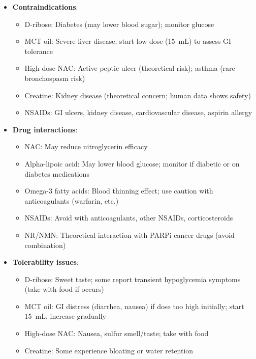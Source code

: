\begin{itemize}
    \item \textbf{Contraindications}:
    \begin{itemize}
        \item D-ribose: Diabetes (may lower blood sugar); monitor glucose
        \item MCT oil: Severe liver disease; start low dose (15~mL) to assess GI tolerance
        \item High-dose NAC: Active peptic ulcer (theoretical risk); asthma (rare bronchospasm risk)
        \item Creatine: Kidney disease (theoretical concern; human data shows safety)
        \item NSAIDs: GI ulcers, kidney disease, cardiovascular disease, aspirin allergy
    \end{itemize}

    \item \textbf{Drug interactions}:
    \begin{itemize}
        \item NAC: May reduce nitroglycerin efficacy
        \item Alpha-lipoic acid: May lower blood glucose; monitor if diabetic or on diabetes medications
        \item Omega-3 fatty acids: Blood thinning effect; use caution with anticoagulants (warfarin, etc.)
        \item NSAIDs: Avoid with anticoagulants, other NSAIDs, corticosteroids
        \item NR/NMN: Theoretical interaction with PARPi cancer drugs (avoid combination)
    \end{itemize}

    \item \textbf{Tolerability issues}:
    \begin{itemize}
        \item D-ribose: Sweet taste; some report transient hypoglycemia symptoms (take with food if occurs)
        \item MCT oil: GI distress (diarrhea, nausea) if dose too high initially; start 15~mL, increase gradually
        \item High-dose NAC: Nausea, sulfur smell/taste; take with food
        \item Creatine: Some experience bloating or water retention
    \end{itemize}


\end{itemize}
